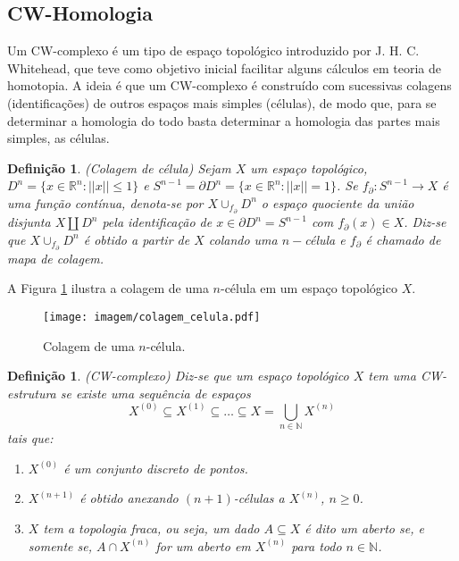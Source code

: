 \documentclass[12pt]{book}
\newtheorem{definicao}[teorema]{Definição}
\newcommand{\skeleton}[1]{X^{(#1)}}
\begin{document}
	\subsection{CW-Homologia}\label{secao_cw_complexo}
	Um CW-complexo é um tipo de espaço topológico introduzido por J. H. C. Whitehead, que teve como objetivo inicial facilitar alguns cálculos em teoria de homotopia. A ideia é que um CW-complexo é construído com sucessivas colagens (identificações) de outros espaços mais simples (células), de modo que, para se determinar a homologia do todo basta determinar a homologia das partes mais simples, as células.
	\begin{definicao}
		(Colagem de célula) Sejam $X$ um espaço topológico, $D^{n}=\{x\in \mathbb{R}^{n} : ||x|| \leq 1\}$ e $S^{n-1} = \partial D^{n}=\{x\in \mathbb{R}^{n} : ||x|| = 1\}$. Se $f_{\partial}:S^{n-1} \to X$ é uma função contínua, denota-se por $X\cup_{f_{\partial}}D^{n}$ o espaço quociente da união disjunta $X \coprod D^{n}$ pela identificação de $x \in \partial D^{n} = S^{n-1}$ com $f_{\partial}(x) \in X$. Diz-se que $X\cup_{f_{\partial}}D^{n}$ é obtido a partir de $X$ colando uma $n-$célula e $f_{\partial}$ é chamado de mapa de colagem.
	\end{definicao}
	
	A Figura \ref{figura_colagem_celula} ilustra a colagem de uma $n$-célula em um espaço topológico $X$.
	
	\begin{figure}[!h]
		\centering
		\texttt{[image: imagem/colagem\_celula.pdf]}
		\caption{Colagem de uma $n$-célula.}
		\label{figura_colagem_celula}
	\end{figure}
	
	\begin{definicao}
		(CW-complexo) Diz-se que um espaço topológico $X$ tem uma CW-estrutura se existe uma sequência de espaços
		$$
		\skeleton{0} \subseteq \skeleton{1} \subseteq \dots \subseteq X = \bigcup \limits_{n\in \mathbb{N}} \skeleton{n}
		$$ 
		tais que:
		\begin{enumerate}
			\item $\skeleton{0}$ é um conjunto discreto de pontos.
			
			\item $\skeleton{n+1}$ é obtido anexando $(n+1)$-células a $\skeleton{n}$, $n\geq0$.
			
			\item $X$ tem a topologia fraca, ou seja, um dado $A \subseteq X$ é dito um aberto se, e somente se, $A \cap \skeleton{n}$ for um aberto em $\skeleton{n}$ para todo $n \in \mathbb{N}$.
		\end{enumerate}
	\end{definicao}
	
\end{document}
